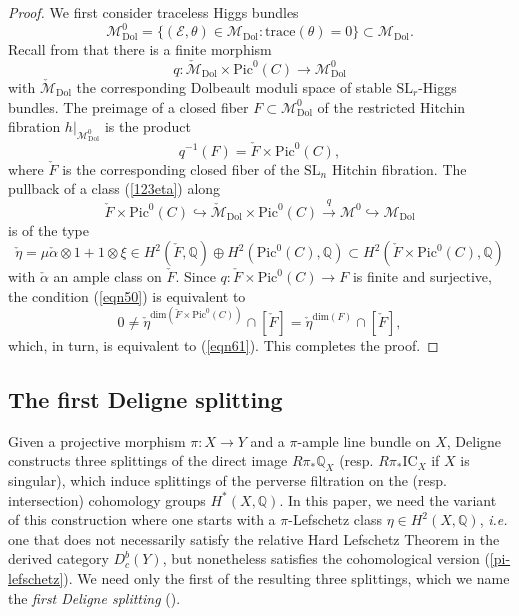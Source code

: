\documentclass[11pt]{amsart}
\theoremstyle{plain}
\theoremstyle{definition}
\theoremstyle{remark}
\newcommand{\BQ}{{\mathbb{Q}}}
\newcommand{\CE}{{\mathcal E}}
\newcommand{\CM}{{\mathcal M}}
\begin{document}
\begin{proof}
We  first consider traceless Higgs bundles
\[
\CM^0_{\mathrm{Dol}} = \{(\CE, \theta) \in \CM_{\mathrm{Dol}}: \mathrm{trace}(\theta)=0\} \subset \CM_{\mathrm{Dol}}.
\]
Recall from \cite[Proposition 2.4.3]{dCHM1} that there is a finite morphism
\[
q: \check{\CM}_{\mathrm{Dol}} \times \mathrm{Pic}^0(C)   \to \CM^0_{\mathrm{Dol}}
\]
with $\check{\CM}_{\mathrm{Dol}}$ the corresponding Dolbeault  moduli  space of stable $\mathrm{SL}_r$-Higgs bundles. The preimage of a closed fiber $F \subset \CM^0_{\mathrm{Dol}}$ of the restricted Hitchin fibration $h|_{\CM^0_{\mathrm{Dol}}}$ is the product
\[
q^{-1}(F) =  \check{F} \times \mathrm{Pic}^0(C),
\]
where $\check{F}$ {is the corresponding  closed fiber} of the $\mathrm{SL}_n$ Hitchin fibration. The pullback of a class (\ref{123eta}) along
\[
\check{F} \times \mathrm{Pic}^0(C) \hookrightarrow \check{\CM}_{\mathrm{Dol}} \times \mathrm{Pic}^0(C)   \xrightarrow{q} \CM^0 \hookrightarrow \CM_{\mathrm{Dol}}
\]
is of the type 
\[
\check{\eta} = \mu \check{\alpha}\otimes 1 + 1\otimes \xi \in H^2(\check{F}, \BQ) \oplus H^2(\mathrm{Pic}^0(C), \BQ) \subset H^2(\check{F} \times \mathrm{Pic}^0(C), \BQ)
\]
with $\check{\alpha}$ an ample class on $\check{F}$. Since $q: \check{F} \times \mathrm{Pic}^0(C) \to F$ is finite
{and surjective}, the condition (\ref{eqn50}) is equivalent to
\[
0 \neq \check{\eta}^{\mathrm{dim}(\check{F} \times \mathrm{Pic}^0(C))} \cap [\check{F}] = \check{\eta}^{\mathrm{dim}(F)}\cap [\check{F}],
\]
which, in turn,  is  equivalent to (\ref{eqn61}). This completes the proof.
\end{proof}

\subsection{The first Deligne splitting}\label{First Deligne Splitting}

Given a projective morphism $\pi : X \to Y$ and a $\pi$-ample line bundle  on $X$, Deligne \cite{D} 
constructs three splittings of the direct image $R\pi_* \BQ_X$ (resp. $R\pi_* \mathrm{IC}_X$ if $X$ is singular), which induce splittings of the perverse filtration on the (resp. intersection) cohomology groups $H^*(X,\BQ)$. In this paper, we need the variant \cite{dC} of this construction
where one starts with a $\pi$-Lefschetz class $\eta \in H^2(X,\BQ)$, \emph{i.e.} one that does not necessarily satisfy the relative Hard Lefschetz Theorem in the derived category $D^b_c(Y)$, but nonetheless satisfies the cohomological version (\ref{pi-lefschetz}).
We need only the first of the resulting three splittings, which we name the \emph{first Deligne splitting}
(\cite{D,dCM4,dC}).
\end{document}
